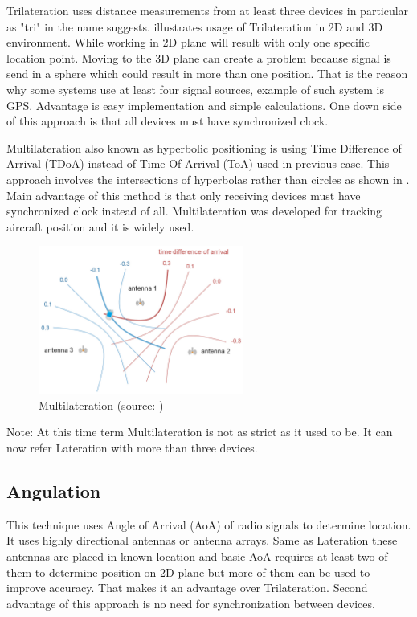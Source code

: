 Trilateration uses distance measurements from at least three devices in particular as "tri" in the name suggests.\cite{RAinWILTaS}  illustrates usage of Trilateration in 2D and 3D environment. While working in 2D plane will result with only one specific location point. Moving to the 3D plane can create a problem because signal is send in a sphere which could result in more than one position. That is the reason why some systems use at least four signal sources, example of such system is GPS.\cite{GNSSGPS} Advantage is easy implementation and simple calculations. One down side of this approach is that all devices must have synchronized clock.\cite{RAinWILTaS}

Multilateration also known as hyperbolic positioning is using Time Difference of Arrival (TDoA) instead of Time Of Arrival (ToA) used in previous case. This approach involves the intersections of hyperbolas rather than circles as shown in . Main advantage of this method is that only receiving devices must have synchronized clock instead of all.\cite{PLTaA} Multilateration was developed for tracking aircraft position and it is widely used.

\begin{figure}[h!]
	\begin{centering}
		\includegraphics[width=0.6\textwidth]{img/multilateration}
		\par\end{centering}
	\caption{Multilateration (source: \cite{HPwAA})\label{fig:Multilateration}}
	\label{fig3}
\end{figure}

Note: At this time term Multilateration is not as strict as it used to be. It can now refer Lateration with more than three devices.

\subsection{Angulation}\label{sec:Angulation}
This technique uses Angle of Arrival (AoA) of radio signals to determine location. It uses highly directional antennas or antenna arrays. Same as Lateration these antennas are placed in known location and basic AoA requires at least two of them to determine position on 2D plane but more of them can be used to improve accuracy.\cite{RAinWILTaS} That makes it an advantage over Trilateration. Second advantage of this approach is no need for synchronization between devices.

